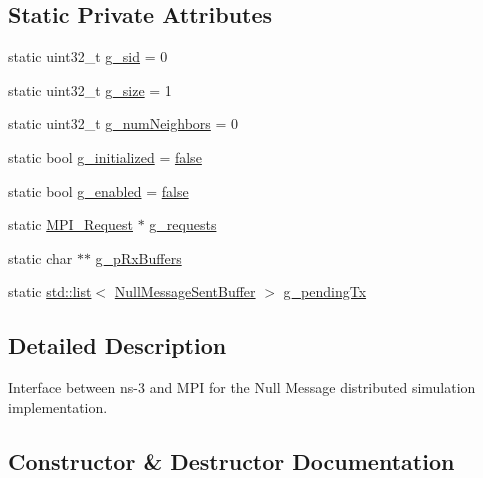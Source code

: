 \subsection*{Static Private Attributes}
\begin{DoxyCompactItemize}
\item 
static uint32\+\_\+t \hyperlink{classns3_1_1NullMessageMpiInterface_aba703fa18812299f38a533175e84789d}{g\+\_\+sid} = 0
\item 
static uint32\+\_\+t \hyperlink{classns3_1_1NullMessageMpiInterface_acbc2b4d714259601b86e1bc1bc13e26a}{g\+\_\+size} = 1
\item 
static uint32\+\_\+t \hyperlink{classns3_1_1NullMessageMpiInterface_afb1c81a47bce9a9b80fea71c80a66ef9}{g\+\_\+num\+Neighbors} = 0
\item 
static bool \hyperlink{classns3_1_1NullMessageMpiInterface_a4f593d0bc0562f63fe183d3351d68c80}{g\+\_\+initialized} = \hyperlink{lte__cqi__generation_8m_ab1bef239d413c4da139c4bac92cd657a}{false}
\item 
static bool \hyperlink{classns3_1_1NullMessageMpiInterface_ab4002d79e5319aae80e5bc39251ba609}{g\+\_\+enabled} = \hyperlink{lte__cqi__generation_8m_ab1bef239d413c4da139c4bac92cd657a}{false}
\item 
static \hyperlink{granted-time-window-mpi-interface_8h_a31b372fd1cca939295900acb2a4961dd}{M\+P\+I\+\_\+\+Request} $\ast$ \hyperlink{classns3_1_1NullMessageMpiInterface_a8a48f62af92d9d68b83296c0a3ddbb3f}{g\+\_\+requests}
\item 
static char $\ast$$\ast$ \hyperlink{classns3_1_1NullMessageMpiInterface_ab6aaed51bb851d090273d5c44fe2aec0}{g\+\_\+p\+Rx\+Buffers}
\item 
static \hyperlink{openflow-interface_8h_afd9bcfa176617760671b67580f536fa7}{std\+::list}$<$ \hyperlink{classns3_1_1NullMessageSentBuffer}{Null\+Message\+Sent\+Buffer} $>$ \hyperlink{classns3_1_1NullMessageMpiInterface_ad4d5d7c2c323bb4f225b7364f8b1c824}{g\+\_\+pending\+Tx}
\end{DoxyCompactItemize}


\subsection{Detailed Description}
Interface between ns-\/3 and M\+PI for the Null Message distributed simulation implementation. 

\subsection{Constructor \& Destructor Documentation}
